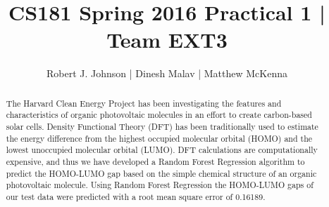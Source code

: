\documentclass{article}
\begin{document}
\title{CS181 Spring 2016 Practical 1 | Team EXT3}
\author{Robert J. Johnson | Dinesh Malav | Matthew McKenna}



\maketitle

\begin{abstract}
The Harvard Clean Energy Project has been investigating the features and characteristics of organic photovoltaic molecules in an effort to create carbon-based solar cells. Density Functional Theory (DFT) has been traditionally used to estimate the energy difference from the highest occupied molecular orbital (HOMO) and the lowest unoccupied molecular orbital (LUMO). DFT calculations are computationally expensive, and thus we have developed a Random Forest Regression algorithm to predict the HOMO-LUMO gap based on the simple chemical structure of an organic photovoltaic molecule. Using Random Forest Regression the HOMO-LUMO gaps of our test data were predicted with a root mean square error of 0.16189. 
\end{abstract}
\end{document}
